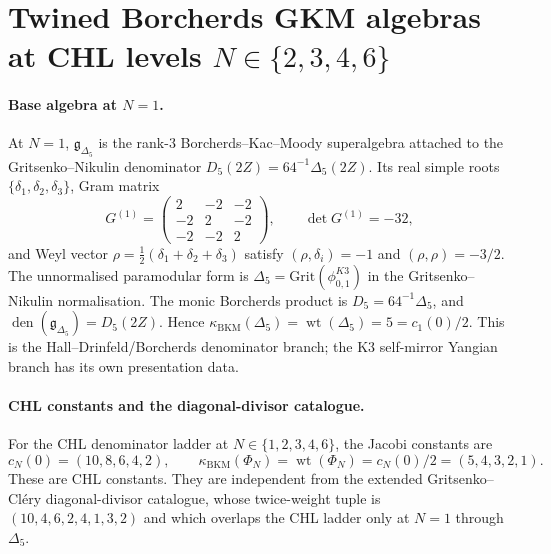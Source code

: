 
\providecommand{\fg}{\mathfrak{g}}
\providecommand{\Bor}{\operatorname{Bor}}
\providecommand{\Grit}{\mathrm{Grit}}
\providecommand{\fgN}{\fg^{(N)}}
\providecommand{\fgDel}{\fg_{\Delta_5}}
\providecommand{\kBKM}{\kappa_{\mathrm{BKM}}}

\section{Twined Borcherds GKM algebras at CHL levels
$N \in \{2,3,4,6\}$}
\label{sec:gkm-borcherds-chl-N-2346}

\paragraph{Base algebra at $N=1$.}
At $N=1$, $\fgDel$ is the rank-$3$ Borcherds--Kac--Moody
superalgebra attached to the Gritsenko--Nikulin denominator
$D_5(2Z)=64^{-1}\Delta_5(2Z)$. Its real simple roots
$\{\delta_1,\delta_2,\delta_3\}$, Gram matrix
\[
  G^{(1)}=
  \begin{pmatrix}
    2&-2&-2\\
    -2&2&-2\\
    -2&-2&2
  \end{pmatrix},
  \qquad \det G^{(1)}=-32,
\]
and Weyl vector $\rho=\tfrac12(\delta_1+\delta_2+\delta_3)$ satisfy
$(\rho,\delta_i)=-1$ and $(\rho,\rho)=-3/2$. The unnormalised
paramodular form is $\Delta_5=\Grit(\phi_{0,1}^{K3})$ in the
Gritsenko--Nikulin normalisation. The monic Borcherds product is
$D_5=64^{-1}\Delta_5$, and
$\operatorname{den}(\fgDel)=D_5(2Z)$. Hence
$\kBKM(\Delta_5)=\operatorname{wt}(\Delta_5)=5=c_1(0)/2$.
This is the Hall--Drinfeld/Borcherds denominator branch; the K3
self-mirror Yangian branch has its own presentation data.

\paragraph{CHL constants and the diagonal-divisor catalogue.}
For the CHL denominator ladder at
$N\in\{1,2,3,4,6\}$, the Jacobi constants are
\[
  c_N(0)=(10,8,6,4,2),
  \qquad
  \kBKM(\Phi_N)=\operatorname{wt}(\Phi_N)=c_N(0)/2=(5,4,3,2,1).
\]
These are CHL constants. They are independent from the extended
Gritsenko--Cl\'ery diagonal-divisor catalogue, whose twice-weight tuple is
$(10,4,6,2,4,1,3,2)$ and which overlaps the CHL ladder only at
$N=1$ through $\Delta_5$.


